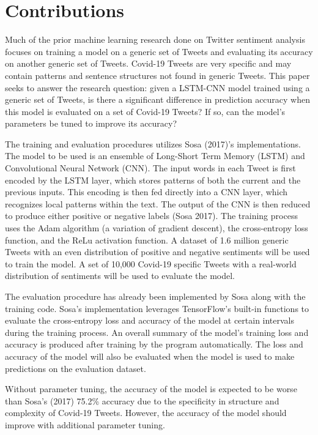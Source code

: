 \documentclass[letterpaper]{article} %
\begin{document}

\section{Contributions}
Much of the prior machine learning research done on Twitter sentiment analysis focuses on training a model on a generic set of Tweets and evaluating its accuracy on another generic set of Tweets. Covid-19 Tweets are very specific and may contain patterns and sentence structures not found in generic Tweets. This paper seeks to answer the research question: given a LSTM-CNN model trained using a generic set of Tweets, is there a significant difference in prediction accuracy when this model is evaluated on a set of Covid-19 Tweets? If so, can the model's parameters be tuned to improve its accuracy?

The training and evaluation procedures utilizes Sosa (2017)'s implementations. The model to be used is an ensemble of Long-Short Term Memory (LSTM) and Convolutional Neural Network (CNN).  The input words in each Tweet is first encoded by the LSTM layer, which stores patterns of both the current and the previous inputs. This encoding is then fed directly into a CNN layer, which recognizes local patterns within the text. The output of the CNN is then reduced to produce either positive or negative labels (Sosa 2017). The training process uses the Adam algorithm (a variation of gradient descent), the cross-entropy loss function, and the ReLu activation function. A dataset of 1.6 million generic Tweets with an even distribution of positive and negative sentiments will be used to train the model. A set of 10,000 Covid-19 specific Tweets with a real-world distribution of sentiments will be used to evaluate the model. 

The evaluation procedure has already been implemented by Sosa along with the training code. Sosa's implementation leverages TensorFlow's built-in functions to evaluate the cross-entropy loss and accuracy of the model at certain intervals during the training process. An overall summary of the model's training loss and accuracy is produced after training by the program automatically. The loss and accuracy of the model will also be evaluated when the model is used to make predictions on the evaluation dataset.

Without parameter tuning, the accuracy of the model is expected to be worse than Sosa's (2017) 75.2\% accuracy due to the specificity in structure and complexity of Covid-19 Tweets. However, the accuracy of the model should improve with additional parameter tuning.
\end{document}
